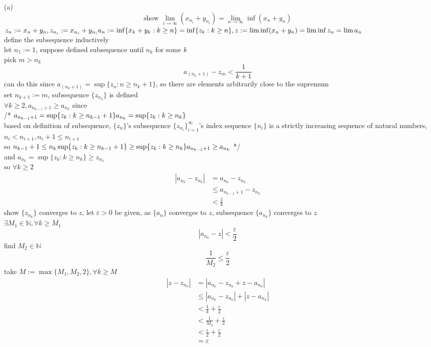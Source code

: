 \documentclass[12pt, border = 4pt, multi]{article} %
\begin{document}
(a)
\[\text{show } \lim_{i \rightarrow \infty} (x_{n_i} + y_{n_i}) = \lim_{n \rightarrow \infty}\inf(x_n + y_n)\]
$z_n := x_n + y_n, z_{n_i} := x_{n_i} + y_{n_i}\\
a_n := \inf\{x_k + y_k: k \geq n\} = \inf\{z_k: k \geq n\}, z := \lim \inf (x_n + y_n) = \lim \inf z_n = \lim a_n$\\
define the subsequence inductively\\
let $n_1 := 1$, suppose defined subsequence until $n_k$ for some $k$\\
pick $m > n_k$
\[a_{(n_k + 1)} - z_m < \frac{1}{k + 1}\]
can do this since $a_{(n_k + 1)} = \sup\{z_n: n \geq n_k + 1\}$, so there are elements arbitrarily close to the supremum\\
set $n_{k + 1} := m$, subsequence $\{z_{n_k}\}$ is defined\\
$\forall k \geq 2, a_{n_{k - 1} + 1} \geq a_{n_k}$ since\\
/* $a_{n_{k - 1} + 1} = \sup\{z_k: k \geq n_{k - 1} + 1\}\\
a_{n_k} = \sup\{z_k: k \geq n_k\}$\\
based on definition of subsequence, $\{z_n\}$'s subsequence $\{z_{n_i}\}_{i = 1} ^ {\infty}$'s index sequence $\{n_i\}$ is a strictly increasing sequence of natural numbers, $n_i < n_{i + 1}, n_i + 1 \leq n_{i + 1}$\\
so $n_{k - 1} + 1 \leq n_k\\
\sup\{z_k: k \geq n_{k - 1} + 1\} \geq \sup\{z_k: k \geq n_k\}\\
a_{n_{k - 1} + 1} \geq a_{n_k}$ */\\
and $a_{n_k} = \sup\{z_k: k \geq n_k\} \geq z_{n_k}$\\
so $\forall k \geq 2$
\begin{align*}
|a_{n_k} - z_{n_k}| &= a_{n_k} - z_{n_k}\\
&\leq a_{n_{k - 1} + 1} - z_{n_k}\\
&< \frac{1}{k}
\end{align*}
show $\{z_{n_k}\}$ converges to $z$, let $\varepsilon > 0$ be given, as $\{a_n\}$ converges to $z$, subsequence $\{a_{n_k}\}$ converges to $z$\\
$\exists M_1 \in \mathbb{N}, \forall k \geq M_1$
\[|a_{n_k} - z| < \frac{\varepsilon}{2}\]
find $M_2 \in \mathbb{N}$
\[\frac{1}{M_2} \leq \frac{\varepsilon}{2}\]
take $M := \max\{M_1, M_2, 2\}, \forall k \geq M$
\begin{align*}
|z - z_{n_k}| &= |a_{n_k} - z_{n_k} + z - a_{n_k}|\\
&\leq |a_{n_k} - z_{n_k}| + |z - a_{n_k}|\\
&< \frac{1}{k} + \frac{\varepsilon}{2}\\
&< \frac{1}{M_2} + \frac{\varepsilon}{2}\\
&< \frac{\varepsilon}{2} + \frac{\varepsilon}{2}\\
&= \varepsilon\\
\end{align*}
\end{document}
